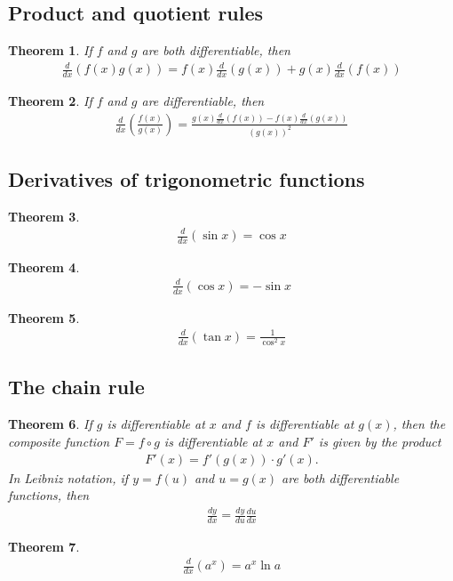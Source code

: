 \documentclass{article}
\theoremstyle{sltheorem}
\newtheorem{theorem}{Theorem}[section]
\begin{document}
\subsection{Product and quotient rules}
\begin{theorem}
    If $f$ and $g$ are both differentiable, then
    \begin{align*}
        \frac{d}{dx}(f(x)g(x))=f(x)\frac{d}{dx}(g(x))+g(x)\frac{d}{dx}(f(x))
    \end{align*}
\end{theorem}
\begin{theorem}
    If $f$ and $g$ are differentiable, then
    \begin{align*}
        \frac{d}{dx}\left(\frac{f(x)}{g(x)}\right)=\frac{g(x)\frac{d}{dx}(f(x))-f(x)\frac{d}{dx}(g(x))}{(g(x))^2}
    \end{align*}
\end{theorem}
\subsection{Derivatives of trigonometric functions}
\begin{theorem}
    \begin{align*}
        \frac{d}{dx}(\sin x)=\cos x
    \end{align*}
\end{theorem}
\begin{theorem}
    \begin{align*}
        \frac{d}{dx}(\cos x)=-\sin x
    \end{align*}
\end{theorem}
\begin{theorem}
    \begin{align*}
        \frac{d}{dx}(\tan x)=\frac{1}{\cos^2 x}
    \end{align*}
\end{theorem}
\subsection{The chain rule}
\begin{theorem}
    If $g$ is differentiable at $x$ and $f$ is differentiable at $g(x)$, then the composite function $F=f\circ g$ is differentiable at $x$ and $F'$ is given by the product
    \begin{align*}
        F'(x)=f'(g(x))\cdot g'(x).
    \end{align*}
    In Leibniz notation, if $y=f(u)$ and $u=g(x)$ are both differentiable functions, then
    \begin{align*}
        \frac{dy}{dx}=\frac{dy}{du}\frac{du}{dx}
    \end{align*}
\end{theorem}
\begin{theorem}
    \begin{align*}
        \frac{d}{dx}(a^x)=a^x\ln a
    \end{align*}
\end{theorem}
\end{document}
